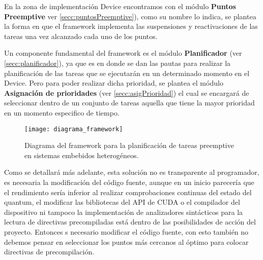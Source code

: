 En la zona de implementación Device encontramos con el módulo \textbf{Puntos Preemptive} ver \ref{secc:puntosPreemptive}), como su nombre lo indica, se plantea la forma en que el framework implementa las suspensiones y reactivaciones de las tareas una vez alcanzado cada uno de los puntos. 
\newline

Un componente fundamental del framework es el módulo \textbf{Planificador} (ver \ref{secc:planificador}), ya que es en donde se dan las pautas para realizar la planificación de las tareas que se ejecutarán en un determinado momento en el Device. Pero para poder realizar dicha prioridad, se plantea el módulo \textbf{Asignación de prioridades} (ver \ref{secc:asigPrioridad}) el cual se encargará de seleccionar dentro de un conjunto de tareas aquella que tiene la mayor prioridad en un momento especifico de tiempo.
\newline

  \begin{figure}[ht]
        \texttt{[image: diagrama\_framework]}
        \caption{Diagrama del framework para la planificación de tareas preemptive en sistemas embebidos heterogéneos.}
        \label{fig:diagramabase}
    \end{figure}
  

  

Como se detallará más adelante, esta solución no es transparente al programador, es necesaria la modificación del código fuente, aunque en un inicio parecería que el rendimiento sería inferior al realizar comprobaciones continuas del estado del quantum, el modificar las bibliotecas del API de CUDA o el compilador del dispositivo ni tampoco la implementación de analizadores sintácticos para la lectura de directivas precompiladas está dentro de las posibilidades de acción del proyecto. 
Entonces s necesario modificar el código fuente, con esto también no debemos pensar en seleccionar los puntos más cercanos al óptimo para colocar directivas de precompilación.
\newline 

